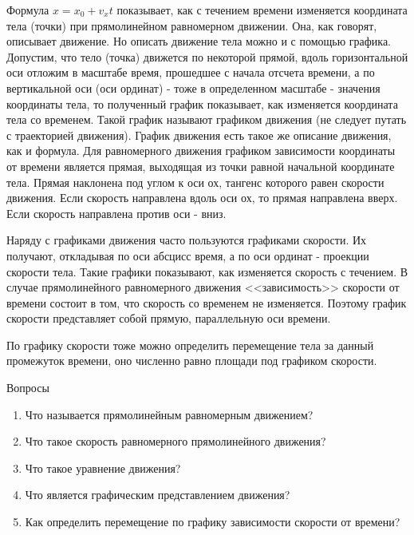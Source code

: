\documentclass[a5paper, 10pt]{diss_4}
\renewcommand{\'}{\,'}
\begin{document}
  Формула $x=x_0+v_xt$ показывает, как с течением времени изменяется координата
 тела (точки) при прямолинейном равномерном движении. Она, как говорят,
описывает движение. Но описать движение тела можно и с помощью графика.
Допустим, что тело (точка) движется по некоторой прямой, вдоль горизонтальной
оси отложим в масштабе время, прошедшее с начала отсчета времени, а по
вертикальной оси (оси ординат) - тоже в определенном масштабе - значения
координаты тела, то полученный график показывает, как изменяется координата
тела со временем. Такой график называют графиком движения (не следует путать
с траекторией движения). График движения есть такое же описание движения, как
и формула. Для равномерного движения графиком зависимости координаты от
времени является прямая, выходящая из точки равной начальной координате тела.
Прямая наклонена под углом к оси ох, тангенс которого равен скорости
движения. Если скорость направлена вдоль оси ох, то прямая направлена вверх.
Если скорость направлена против оси - вниз.

 Наряду с графиками движения часто пользуются графиками скорости. Их получают,
откладывая по оси абсцисс время, а по оси ординат - проекции скорости тела.
Такие графики показывают, как изменяется скорость с течением. В случае
прямолинейного равномерного движения <<зависимость>> скорости от времени
состоит в том, что скорость со временем не изменяется. Поэтому график
скорости представляет собой прямую, параллельную оси времени.

  По графику скорости тоже можно определить перемещение тела за данный
промежуток времени, оно численно равно площади под графиком скорости.

\begin{center}
   Вопросы
\end{center}

\begin{enumerate}
\item Что называется прямолинейным равномерным движением?

\item Что такое скорость равномерного прямолинейного движения?

\item Что такое уравнение движения?

\item Что является графическим представлением движения?

\item Как определить перемещение по графику зависимости скорости от времени?
\end{enumerate}
\end{document}
